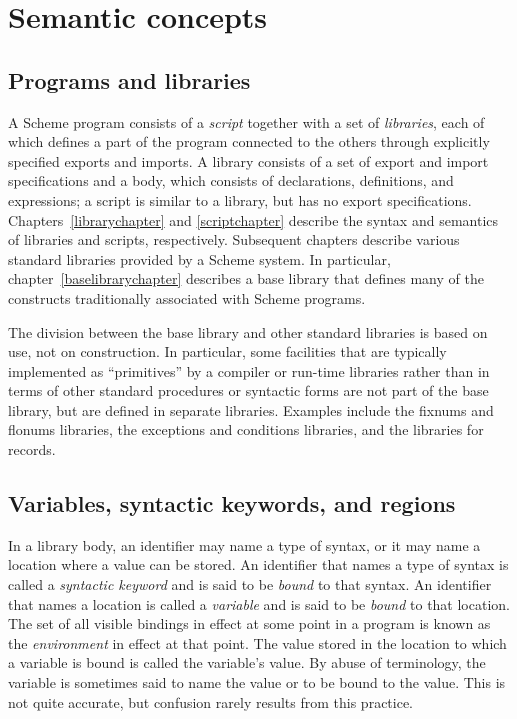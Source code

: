 \chapter{Semantic concepts}
\label{basicchapter}

\section{Programs and libraries}

A Scheme program consists of a \textit{script}
together with a set of \textit{libraries}, each
of which defines a part of the program connected to the others through
explicitly specified exports and imports.  A library consists of a set
of export and import specifications and a body, which consists of
declarations, definitions, and expressions;
a script is similar to a library, but
has no export specifications.
Chapters~\ref{librarychapter} and \ref{scriptchapter}
describe the syntax and semantics of libraries and scripts,
respectively.  Subsequent chapters
describe various standard libraries provided by a Scheme system.  In
particular, chapter~\ref{baselibrarychapter} describes a base
library that defines many of the constructs traditionally associated with
Scheme programs.

The division between the base library and other standard libraries is
based on use, not on construction.  In particular, some facilities
that are typically implemented as ``primitives'' by a compiler or
run-time libraries rather than in terms of other standard procedures
 or syntactic forms are not part of the base library, but are defined in
separate libraries.  Examples include the fixnums and flonums libraries,
the exceptions and conditions libraries, and the libraries for
records.

\section{Variables, syntactic keywords, and regions}
\label{specialformsection}
\label{variablesection}

In a library body,
an identifier may name a type of syntax, or it may name
a location where a value can be stored.  An identifier that names a type
of syntax is called a {\em syntactic keyword}
and is said to be {\em bound} to that syntax.  An identifier that names a
location is called a {\em variable} and is said to be
{\em bound} to that location.  The set of all visible
bindings in effect at some point in a program is
known as the {\em environment} in effect at that point.  The value
stored in the location to which a variable is bound is called the
variable's value.  By abuse of terminology, the variable is sometimes
said to name the value or to be bound to the value.  This is not quite
accurate, but confusion rarely results from this practice.

